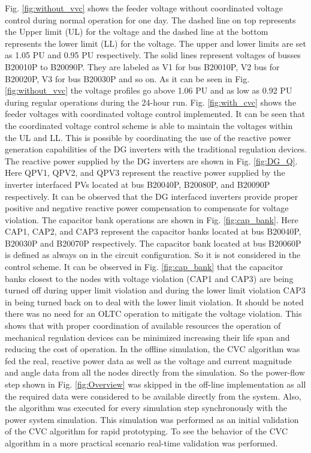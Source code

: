 Fig. \ref{fig:without_vvc} shows the feeder voltage without coordinated voltage control during normal operation for one day. The dashed line on top represents the Upper limit (UL) for the voltage and the dashed line at the bottom represents the lower limit (LL) for the voltage. The upper and lower limits are set as 1.05 PU and 0.95 PU respectively. The solid lines represent voltages of busses B20010P to B20090P. They are labeled as V1 for bus B20010P, V2 bus for B20020P, V3 for bus B20030P and so on. As it can be seen in Fig. \ref{fig:without_vvc} the voltage profiles go above 1.06 PU and as low as 0.92 PU during regular operations during the 24-hour run. 
Fig. \ref{fig:with_cvc} shows the feeder voltages with coordinated voltage control implemented. It can be seen that the coordinated voltage control scheme is able to maintain the voltages within the UL and LL. This is possible by coordinating the use of the reactive power generation capabilities of the DG inverters with the traditional regulation devices. The reactive power supplied by the DG inverters are shown in Fig. \ref{fig:DG_Q}. Here QPV1, QPV2, and QPV3 represent the reactive power supplied by the inverter interfaced PVs located at bus B20040P, B20080P, and B20090P respectively. It can be observed that the DG interfaced inverters provide proper positive and negative reactive power compensation to compensate for voltage violation. The capacitor bank operations are shown in Fig. \ref{fig:cap_bank}. Here CAP1, CAP2, and CAP3 represent the capacitor banks located at bus B20040P, B20030P and B20070P respectively. The capacitor bank located at bus B20060P is defined as always on in the circuit configuration. So it is not considered in the control scheme. It can be observed in Fig. \ref{fig:cap_bank} that the capacitor banks closest to the nodes with voltage violation (CAP1 and CAP3) are being turned off during upper limit violation and during the lower limit violation CAP3 in being turned back on to deal with the lower limit violation. It should be noted there was no need for an OLTC operation to mitigate the voltage violation. This shows that with proper coordination of available resources the operation of mechanical regulation devices can be minimized increasing their life span and reducing the cost of operation. In the offline simulation, the CVC algorithm was fed the real, reactive power data as well as the voltage and current magnitude and angle data from all the nodes directly from the simulation. So the power-flow step shown in Fig. \ref{fig:Overview} was skipped in the off-line implementation as all the required data were considered to be available directly from the system. Also, the algorithm was executed for every simulation step synchronously with the power system simulation. This simulation was performed as an initial validation of the CVC algorithm for rapid prototyping. To see the behavior of the CVC algorithm in a more practical scenario real-time validation was performed.

